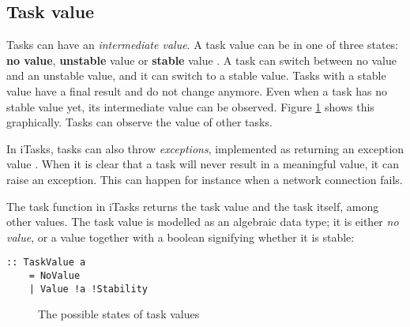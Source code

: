 \subsection{Task value}\label{section-top-task-value}
Tasks can have an \textit{intermediate value}. A task value can be in one of three states: \textbf{no value}, \textbf{unstable} value or \textbf{stable} value \cite[\S 4.3]{achten2013introduction}. A task can switch between no value and an unstable value, and it can switch to a stable value. Tasks with a stable value have a final result and do not change anymore. Even when a task has no stable value yet, its intermediate value can be observed. Figure \ref{fig:task_states} shows this graphically. Tasks can observe the value of other tasks.

In iTasks, tasks can also throw \textit{exceptions}, implemented as returning an exception value \cite[\S 3.1.1]{plasmeijer2012task}. When it is clear that a task will never result in a meaningful value, it can raise an exception. This can happen for instance when a network connection fails.

The task function in iTasks returns the task value and the task itself, among other values. The task value is modelled as an algebraic data type; it is either \textit{no value}, or a value together with a boolean signifying whether it is stable:

\medskip
\begin{verbatim}
:: TaskValue a
    = NoValue
    | Value !a !Stability
\end{verbatim}

\begin{figure}
    \centering
    \caption{The possible states of task values}
    \label{fig:task_states}
\end{figure}

